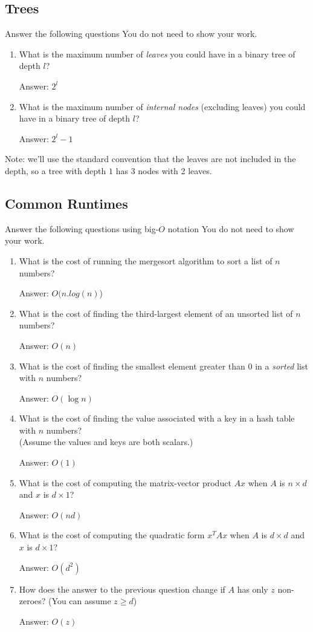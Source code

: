 \documentclass{article}
\def\ans#1{\par\gre{Answer: #1}}
\def\blu#1{{\color{blu}#1}}
\def\gre#1{{\color{gre}#1}}
\begin{document}
\subsection{Trees}

\blu{Answer the following questions} You do not need to show your work.
\begin{enumerate}
\item What is the maximum number of \emph{leaves} you could have in a binary tree of depth $l$?
\ans{$2^l$}
\item What is the maximum number of \emph{internal nodes} (excluding leaves) you could have in a binary tree of depth $l$?
\ans{$2^l-1$}
\end{enumerate}
Note: we'll use the standard convention that the leaves are not included in the depth, so a tree with depth $1$ has 3 nodes with 2 leaves.

\subsection{Common Runtimes}

\blu{Answer the following questions using big-$O$ notation} You do not need to show your work.
\begin{enumerate}
\item What is the cost of running the mergesort algorithm to sort  a list of $n$ numbers?
\ans{$O(n.log(n)$)}
\item What is the cost of finding the third-largest element of an unsorted list of $n$ numbers?
\ans{$O(n)$}
\item What is the cost of finding the smallest element greater than 0 in a \emph{sorted} list with $n$ numbers?
\ans{$O(\log{n})$}
\item What is the cost of finding the value associated with a key in a hash table with $n$ numbers? \\(Assume the values and keys are both scalars.)
\ans{$O(1)$}
\item What is the cost of computing the matrix-vector product $Ax$ when $A$ is $n \times d$ and $x$ is $d \times 1$?
\ans{$O(nd)$}
\item What is the cost of computing the quadratic form $x^TAx$ when $A$ is $d \times d$ and $x$ is $d \times 1$?
\ans{$O(d^2)$}
\item How does the answer to the previous question change if $A$ has only $z$ non-zeroes? (You can assume $z \geq d$)
\ans{$O(z)$}
\end{enumerate}
\end{document}
